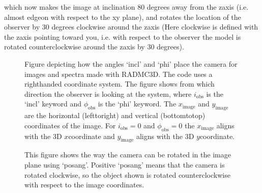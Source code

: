 \documentclass[letterpaper,10pt,english]{sphinxmanual}
\begin{document}
\begin{sphinxVerbatim}[commandchars=\\\{\}]
       
\end{sphinxVerbatim}

which now makes the image at inclination 80 degrees away from the z\sphinxhyphen{}axis
(i.e. almost edge\sphinxhyphen{}on with respect to the x\sphinxhyphen{}y plane), and rotates the
location of the observer by 30 degrees clockwise around the
z\sphinxhyphen{}axis (Here clockwise is defined with the z\sphinxhyphen{}axis pointing toward
you, i.e. with respect to the observer the model is rotated
counter\sphinxhyphen{}clockwise around the z\sphinxhyphen{}axis by 30 degrees).

\begin{figure}[htbp]
\centering
\capstart

\noindent{}
\caption{Figure depicting how the angles ‘incl’ and ‘phi’ place the camera for images
and spectra made with RADMC\sphinxhyphen{}3D. The code uses a right\sphinxhyphen{}handed coordinate
system. The figure shows from which direction the observer is looking at the
system, where \(i_{\mathrm{obs}}\) is the ‘incl’ keyword and
\(\phi_{\mathrm{obs}}\) is the ‘phi’ keyword. The
\(x_{\mathrm{image}}\) and \(y_{\mathrm{image}}\) are the horizontal
(left\sphinxhyphen{}to\sphinxhyphen{}right) and vertical (bottom\sphinxhyphen{}to\sphinxhyphen{}top) coordinates of the image. For
\(i_{\mathrm{obs}}=0\) and \(\phi_{\mathrm{obs}}=0\) the
\(x_{\mathrm{image}}\) aligns with the 3\sphinxhyphen{}D \(x\)\sphinxhyphen{}coordinate and
\(y_{\mathrm{image}}\) aligns with the 3\sphinxhyphen{}D \(y\)\sphinxhyphen{}coordinate.}\label{\detokenize{imagesspectra:id3}}\label{\detokenize{imagesspectra:fig-cameraorient}}\end{figure}

\begin{figure}[htbp]
\centering
\capstart

\noindent{}
\caption{This figure shows the way the camera can be rotated in the image plane using
‘posang’. Positive ‘posang’ means that the camera is rotated clockwise, so
the object shown is rotated counter\sphinxhyphen{}clockwise with respect to the image
coordinates.}\label{\detokenize{imagesspectra:id4}}\label{\detokenize{imagesspectra:fig-posang}}\end{figure}
\end{document}

